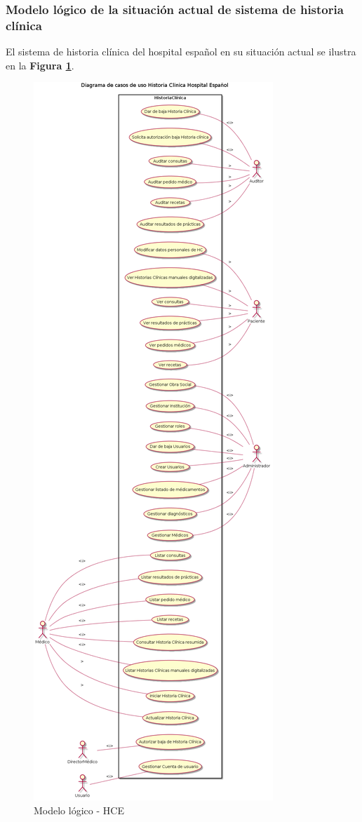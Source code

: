 \subsubsection{Modelo lógico de la situación actual de sistema de historia clínica}
El sistema de historia clínica del hospital español en su situación actual se ilustra en la \textbf{Figura \ref{mlogicoHCE}}.


\begin{figure}
  \centering
  \includegraphics[width=.688\textwidth]{img/tp1/HCHEModeloFuncional}
  \caption{Modelo lógico - HCE}
  \label{mlogicoHCE}
\end{figure}



